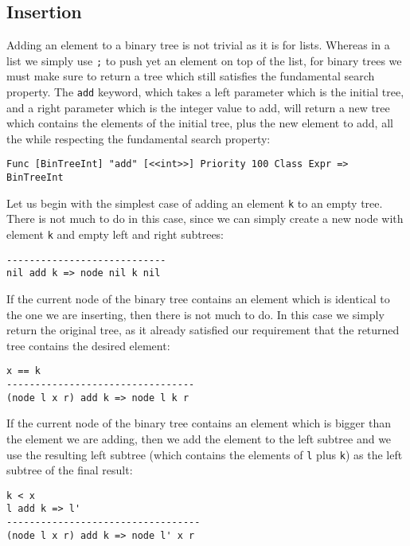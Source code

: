 \subsection{Insertion}
Adding an element to a binary tree is not trivial as it is for lists. Whereas in a list we simply use \texttt{;} to push yet an element on top of the list, for binary trees we must make sure to return a tree which still satisfies the fundamental search property. The \texttt{add} keyword, which takes a left parameter which is the initial tree, and a right parameter which is the integer value to add, will return a new tree which contains the elements of the initial tree, plus the new element to add, all the while respecting the fundamental search property:

\begin{lstlisting}
Func [BinTreeInt] "add" [<<int>>] Priority 100 Class Expr => BinTreeInt
\end{lstlisting}

Let us begin with the simplest case of adding an element \texttt{k} to an empty tree. There is not much to do in this case, since we can simply create a new node with element \texttt{k} and empty left and right subtrees:

\begin{lstlisting}
----------------------------
nil add k => node nil k nil
\end{lstlisting}

If the current node of the binary tree contains an element which is identical to the one we are inserting, then there is not much to do. In this case we simply return the original tree, as it already satisfied our requirement that the returned tree contains the desired element:

\begin{lstlisting}
x == k
---------------------------------
(node l x r) add k => node l k r
\end{lstlisting}

If the current node of the binary tree contains an element which is bigger than the element we are adding, then we add the element to the left subtree and we use the resulting left subtree (which contains the elements of \texttt{l} plus \texttt{k}) as the left subtree of the final result:

\begin{lstlisting}
k < x
l add k => l'
----------------------------------
(node l x r) add k => node l' x r
\end{lstlisting}

